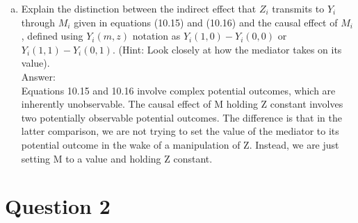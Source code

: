 \documentclass[11pt,notitlepage]{article}\usepackage[]{graphicx}\usepackage[]{color}
\makeatletter
\newenvironment{kframe}{%
 \def\at@end@of@kframe{}%
 \ifinner\ifhmode%
  \def\at@end@of@kframe{\end{minipage}}%
  \begin{minipage}{\columnwidth}%
 \fi\fi%
 \def\FrameCommand##1{\hskip\@totalleftmargin \hskip-\fboxsep
 \colorbox{shadecolor}{##1}\hskip-\fboxsep
     \hskip-\linewidth \hskip-\@totalleftmargin \hskip\columnwidth}%
 \MakeFramed {\advance\hsize-\width
   \@totalleftmargin\z@ \linewidth\hsize
   \@setminipage}}%
 {\par\unskip\endMakeFramed%
 \at@end@of@kframe}
\newenvironment{knitrout}{}{} %
\makeatother
\begin{document}
\begin{enumerate}[a)]
\item Explain the distinction between the indirect effect that $Z_i$ transmits to $Y_i$ through $M_i$ given in equations (10.15) and (10.16) and the causal effect of $M_i$, defined using $Y_i(m, z)$ notation as $Y_i(1, 0) - Y_i(0, 0)$ or $Y_i(1, 1) - Y_i(0, 1)$. (Hint: Look closely at how the mediator takes on its value).\\
Answer:\\
Equations 10.15 and 10.16 involve complex potential outcomes, which are inherently unobservable. The causal effect of M holding Z constant involves two potentially observable potential outcomes. The difference is that in the latter comparison, we are not trying to set the value of the mediator to its potential outcome in the wake of a manipulation of Z. Instead, we are just setting M to a value and holding Z constant.
\end{enumerate}


\section*{Question 2}
\begin{knitrout}
\color{fgcolor}\begin{kframe}
\begin{verbatim}





\end{verbatim}
\end{kframe}
\end{knitrout}
\end{document}
